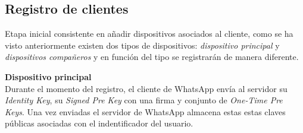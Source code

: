 \subsection{Registro de clientes}
Etapa inicial consistente en añadir dispositivos asociados al cliente, como se ha visto anteriormente existen dos tipos de dispositivos: \emph{dispositivo principal} y \emph{dispositivos compañeros} y en función del tipo se registrarán de manera diferente.
\begin{description}
	\item \textbf{Dispositivo principal}\\
	Durante el momento del registro, el cliente de WhatsApp envía al servidor su \emph{Identity Key}, su \emph{Signed Pre Key} con una firma y conjunto de \emph{One-Time Pre Keys}. Una vez enviadas el servidor de WhatsApp almacena estas estas claves públicas asociadas con el indentificador del usuario.


\end{description}
